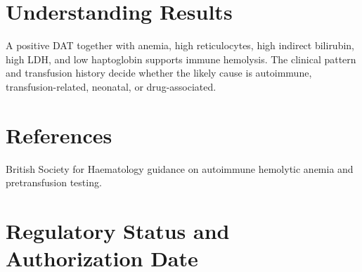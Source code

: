 \section*{Understanding Results}
A positive DAT together with anemia, high reticulocytes, high indirect bilirubin, high LDH, and low haptoglobin supports immune hemolysis. The clinical pattern and transfusion history decide whether the likely cause is autoimmune, transfusion-related, neonatal, or drug-associated.

\section*{References}
British Society for Haematology guidance on autoimmune hemolytic anemia and pretransfusion testing.

\clearpage


\section*{Regulatory Status and Authorization Date}

\clearpage

